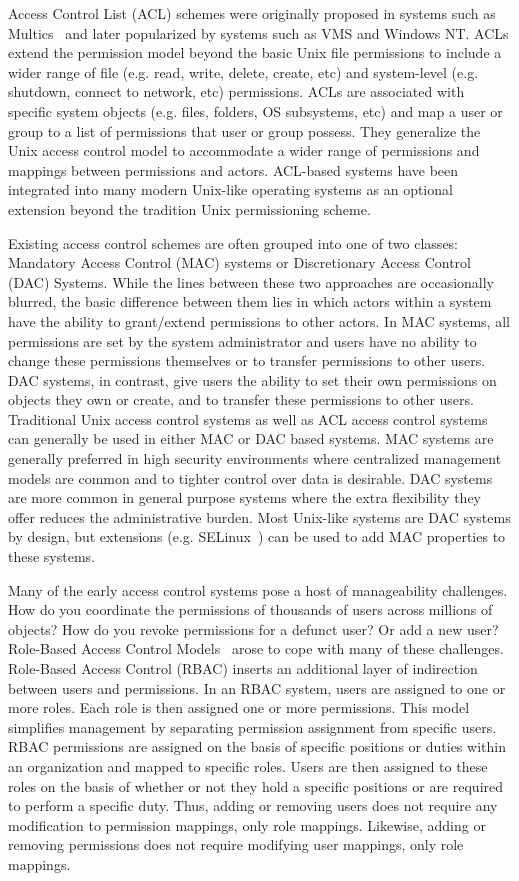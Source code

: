 Access Control List (ACL) schemes were originally proposed in systems
such as Multics~\cite{saltzer1974} and later popularized by systems
such as VMS and Windows NT. ACLs extend the permission model beyond
the basic Unix file permissions to include a wider range of file
(e.g. read, write, delete, create, etc) and system-level
(e.g. shutdown, connect to network, etc) permissions. ACLs are
associated with specific system objects (e.g. files, folders, OS
subsystems, etc) and map a user or group to a list of permissions that
user or group possess. They generalize the Unix access control model
to accommodate a wider range of permissions and mappings between
permissions and actors. ACL-based systems have been integrated into
many modern Unix-like operating systems as an optional extension
beyond the tradition Unix permissioning scheme.

Existing access control schemes are often grouped into one of two
classes: Mandatory Access Control (MAC) systems or Discretionary
Access Control (DAC) Systems. While the lines between these two
approaches are occasionally blurred, the basic difference between them
lies in which actors within a system have the ability to grant/extend
permissions to other actors. In MAC systems, all permissions are set
by the system administrator and users have no ability to change these
permissions themselves or to transfer permissions to other users. DAC
systems, in contrast, give users the ability to set their own
permissions on objects they own or create, and to transfer these
permissions to other users. Traditional Unix access control systems as
well as ACL access control systems can generally be used in either MAC
or DAC based systems. MAC systems are generally preferred in high
security environments where centralized management models are common
and to tighter control over data is desirable. DAC systems are more
common in general purpose systems where the extra flexibility they
offer reduces the administrative burden. Most Unix-like systems are
DAC systems by design, but extensions
(e.g. SELinux~\cite{loscocco2001}) can be used to add MAC properties
to these systems.

Many of the early access control systems pose a host of manageability
challenges. How do you coordinate the permissions of thousands of
users across millions of objects? How do you revoke permissions for a
defunct user? Or add a new user?  Role-Based Access Control
Models~\cite{sandhu1996} arose to cope with many of these challenges.
Role-Based Access Control (RBAC) inserts an additional layer of
indirection between users and permissions. In an RBAC system, users
are assigned to one or more roles. Each role is then assigned one or
more permissions. This model simplifies management by separating
permission assignment from specific users. RBAC permissions are
assigned on the basis of specific positions or duties within an
organization and mapped to specific roles. Users are then assigned to
these roles on the basis of whether or not they hold a specific
positions or are required to perform a specific duty. Thus, adding or
removing users does not require any modification to permission
mappings, only role mappings. Likewise, adding or removing permissions
does not require modifying user mappings, only role mappings.

